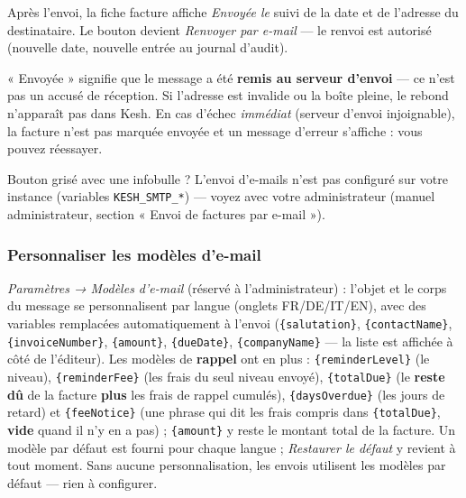 \documentclass[a4paper,11pt,oneside]{article}
\begin{document}
Après l'envoi, la fiche facture affiche \emph{Envoyée le} suivi de la date
et de l'adresse du destinataire. Le bouton devient \emph{Renvoyer par
e-mail} — le renvoi est autorisé (nouvelle date, nouvelle entrée au journal d'audit).

\begin{keshnote}
« Envoyée » signifie que le message a été \textbf{remis au serveur
d'envoi} — ce n'est pas un accusé de réception. Si l'adresse est invalide ou
la boîte pleine, le rebond n'apparaît pas dans Kesh. En cas d'échec
\emph{immédiat} (serveur d'envoi injoignable), la facture n'est pas marquée
envoyée et un message d'erreur s'affiche : vous pouvez réessayer.
\end{keshnote}

\begin{keshtip}
Bouton grisé avec une infobulle ? L'envoi d'e-mails n'est pas configuré sur
votre instance (variables \texttt{KESH\_SMTP\_*}) — voyez avec votre
administrateur (manuel administrateur, section « Envoi de factures par
e-mail »).
\end{keshtip}

\subsubsection{Personnaliser les modèles d'e-mail}

\begin{sloppypar}
\emph{Paramètres → Modèles d'e-mail} (réservé à l'administrateur) : l'objet
et le corps du message se personnalisent par langue (onglets FR/DE/IT/EN),
avec des variables remplacées automatiquement à l'envoi
(\texttt{\{salutation\}}, \texttt{\{contactName\}},
\texttt{\{invoiceNumber\}}, \texttt{\{amount\}}, \texttt{\{dueDate\}},
\texttt{\{companyName\}} — la liste est affichée à côté de l'éditeur). Les
modèles de \textbf{rappel} ont en plus : \texttt{\{reminderLevel\}} (le niveau),
\texttt{\{reminderFee\}} (les frais du seul niveau envoyé),
\texttt{\{totalDue\}} (le \textbf{reste dû} de la facture \textbf{plus} les frais
de rappel cumulés), \texttt{\{daysOverdue\}} (les jours de retard) et
\texttt{\{feeNotice\}} (une phrase qui dit les frais compris dans
\texttt{\{totalDue\}}, \textbf{vide} quand il n'y en a pas) ;
\texttt{\{amount\}} y reste le montant total de la facture. Un
modèle par défaut est fourni pour chaque langue ; \emph{Restaurer le défaut}
y revient à tout moment. Sans aucune personnalisation, les envois utilisent
les modèles par défaut — rien à configurer.
\end{sloppypar}
\end{document}
